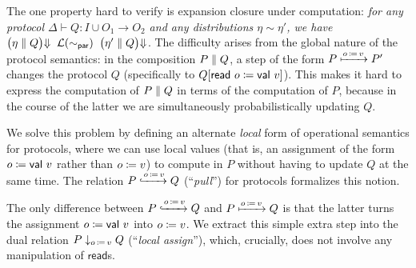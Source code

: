 The one property hard to verify is expansion closure under computation: \emph{for any protocol $\Delta \vdash Q : I \cup O_1 \to O_2$ and any distributions $\eta \sim \eta'$, we have ${\big(\eta \; \| \; Q\big) \hspace{-2.5pt} \Downarrow} \;\; \mathcal{L}(\sim_\mathsf{par}) \;\; {\big(\eta' \; \| \; Q\big) \hspace{-2.5pt} \Downarrow}$}. The difficulty arises from the global nature of the protocol semantics: in the composition $P \; \| \; Q$, a step of the form $P \xmapsto{o \, \coloneqq \, v} P'$ changes the protocol $Q$ (specifically to $Q[\mathsf{read} \ o \coloneqq \mathsf{val} \ v]$). This makes it hard to express the computation of $P \; \| \; Q$ in terms of the computation of $P$, because in the course of the latter we are simultaneously probabilistically updating $Q$.

We solve this problem by defining an alternate \emph{local} form of operational semantics for \ipdl protocols, where we can use local values (that is, an assignment of the form $o \coloneqq \mathsf{val} \ v$ rather than $o \coloneqq v$) to compute in $P$ without having to update $Q$ at the same time. The relation $P \xhookrightarrow{o \, \coloneqq \, v} Q$ (``\emph{pull}'') for protocols formalizes this notion.
The only difference between $P \xhookrightarrow{o \, \coloneqq \, v} Q$ and $P \xmapsto{o \, \coloneqq \, v} Q$ is that the latter turns the assignment $o \coloneqq \mathsf{val} \ v$ into $o \coloneqq v$. We extract this simple extra step into the dual relation $P \downarrow_{o \, \coloneqq \, v} Q$ (``\emph{local assign}''), which, crucially, does not involve any manipulation of $\mathsf{read}$s.
